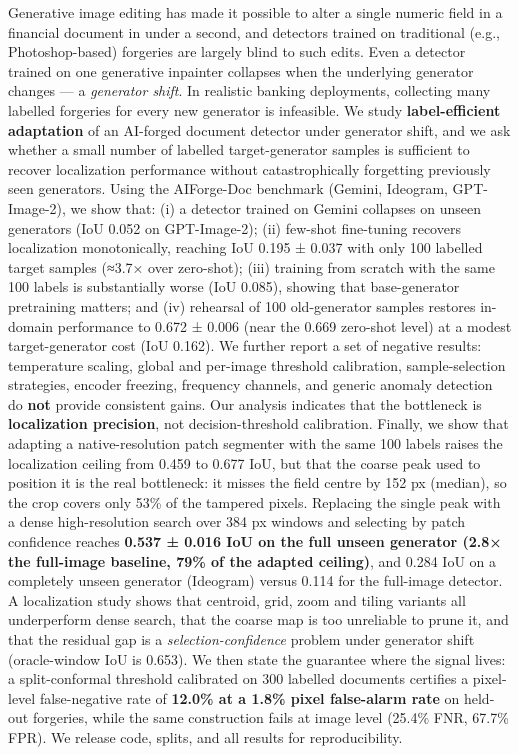 Generative image editing has made it possible to alter a single numeric field in a financial document in under a second, and detectors trained on traditional (e.g., Photoshop-based) forgeries are largely blind to such edits. Even a detector trained on one generative inpainter collapses when the underlying generator changes --- a \emph{generator shift}. In realistic banking deployments, collecting many labelled forgeries for every new generator is infeasible. We study \textbf{label-efficient adaptation} of an AI-forged document detector under generator shift, and we ask whether a small number of labelled target-generator samples is sufficient to recover localization performance without catastrophically forgetting previously seen generators. Using the AIForge-Doc benchmark (Gemini, Ideogram, GPT-Image-2), we show that: (i) a detector trained on Gemini collapses on unseen generators (IoU 0.052 on GPT-Image-2); (ii) few-shot fine-tuning recovers localization monotonically, reaching IoU 0.195 ± 0.037 with only 100 labelled target samples (≈3.7× over zero-shot); (iii) training from scratch with the same 100 labels is substantially worse (IoU 0.085), showing that base-generator pretraining matters; and (iv) rehearsal of 100 old-generator samples restores in-domain performance to 0.672 ± 0.006 (near the 0.669 zero-shot level) at a modest target-generator cost (IoU 0.162). We further report a set of negative results: temperature scaling, global and per-image threshold calibration, sample-selection strategies, encoder freezing, frequency channels, and generic anomaly detection do \textbf{not} provide consistent gains. Our analysis indicates that the bottleneck is \textbf{localization precision}, not decision-threshold calibration. Finally, we show that adapting a native-resolution patch segmenter with the same 100 labels raises the localization ceiling from 0.459 to 0.677 IoU, but that the coarse peak used to position it is the real bottleneck: it misses the field centre by 152 px (median), so the crop covers only 53\% of the tampered pixels. Replacing the single peak with a dense high-resolution search over 384 px windows and selecting by patch confidence reaches \textbf{0.537 ± 0.016 IoU on the full unseen generator (2.8× the full-image baseline, 79\% of the adapted ceiling)}, and 0.284 IoU on a completely unseen generator (Ideogram) versus 0.114 for the full-image detector. A localization study shows that centroid, grid, zoom and tiling variants all underperform dense search, that the coarse map is too unreliable to prune it, and that the residual gap is a \emph{selection-confidence} problem under generator shift (oracle-window IoU is 0.653). We then state the guarantee where the signal lives: a split-conformal threshold calibrated on 300 labelled documents certifies a pixel-level false-negative rate of \textbf{12.0\% at a 1.8\% pixel false-alarm rate} on held-out forgeries, while the same construction fails at image level (25.4\% FNR, 67.7\% FPR). We release code, splits, and all results for reproducibility.

